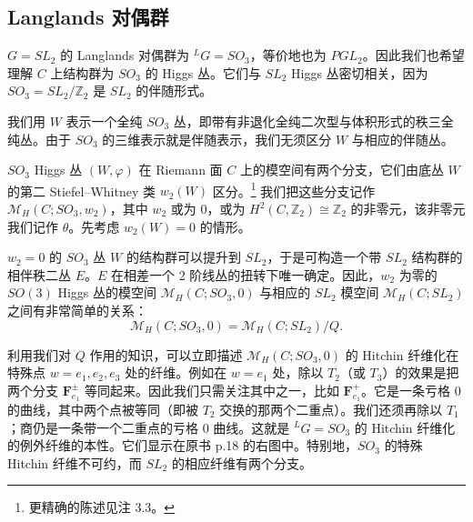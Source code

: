 

\subsection{Langlands 对偶群}

$G=SL_2$ 的 Langlands 对偶群为 ${}^{L}G=SO_3$，等价地也为 $PGL_2$。因此我们也希望理解 $C$ 上结构群为 $SO_3$ 的 Higgs 丛。它们与 $SL_2$ Higgs 丛密切相关，因为 $SO_3=SL_2/\mathbb{Z}_2$ 是 $SL_2$ 的伴随形式。

我们用 $W$ 表示一个全纯 $SO_3$ 丛，即带有非退化全纯二次型与体积形式的秩三全纯丛。由于 $SO_3$ 的三维表示就是伴随表示，我们无须区分 $W$ 与相应的伴随丛。

$SO_3$ Higgs 丛 $(W,\varphi)$ 在 Riemann 面 $C$ 上的模空间有两个分支，它们由底丛 $W$ 的第二 Stiefel--Whitney 类 $w_2(W)$ 区分。\footnote{更精确的陈述见注 3.3。} 我们把这些分支记作 $\mathcal{M}_H(C;SO_3,w_2)$，其中 $w_2$ 或为 $0$，或为 $H^2(C,\mathbb{Z}_2)\cong\mathbb{Z}_2$ 的非零元，该非零元我们记作 $\theta$。先考虑 $w_2(W)=0$ 的情形。

$w_2=0$ 的 $SO_3$ 丛 $W$ 的结构群可以提升到 $SL_2$，于是可构造一个带 $SL_2$ 结构群的相伴秩二丛 $E$。$E$ 在相差一个 2 阶线丛的扭转下唯一确定。因此，$w_2$ 为零的 $SO(3)$ Higgs 丛的模空间 $\mathcal{M}_H(C;SO_3,0)$ 与相应的 $SL_2$ 模空间 $\mathcal{M}_H(C;SL_2)$ 之间有非常简单的关系：
\begin{equation}\tag{3.20}
\mathcal{M}_H(C;SO_3,0)=\mathcal{M}_H(C;SL_2)/Q.
\end{equation}

利用我们对 $Q$ 作用的知识，可以立即描述 $\mathcal{M}_H(C;SO_3,0)$ 的 Hitchin 纤维化在特殊点 $w=e_1,e_2,e_3$ 处的纤维。例如在 $w=e_1$ 处，除以 $T_2$（或 $T_3$）的效果是把两个分支 $\boldsymbol{F}^\pm_{e_1}$ 等同起来。因此我们只需关注其中之一，比如 $\boldsymbol{F}^+_{e_1}$。它是一条亏格 $0$ 的曲线，其中两个点被等同（即被 $T_2$ 交换的那两个二重点）。我们还须再除以 $T_1$；商仍是一条带一个二重点的亏格 $0$ 曲线。这就是 ${}^{L}G=SO_3$ 的 Hitchin 纤维化的例外纤维的本性。它们显示在原书 p.18 的右图中。特别地，$SO_3$ 的特殊 Hitchin 纤维不可约，而 $SL_2$ 的相应纤维有两个分支。

